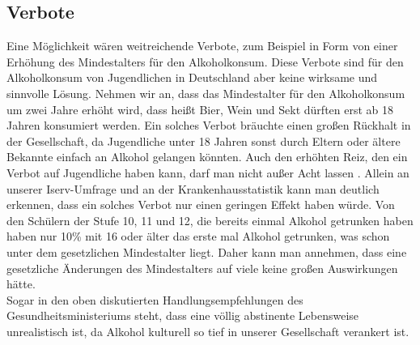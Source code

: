 \documentclass[12pt]{article}
\begin{document}
\subsection{Verbote}
Eine Möglichkeit wären weitreichende Verbote, zum Beispiel in Form von einer Erhöhung des Mindestalters für den Alkoholkonsum. Diese Verbote sind für den Alkoholkonsum von Jugendlichen in Deutschland aber keine wirksame und sinnvolle Lösung. Nehmen wir an, dass das Mindestalter für den Alkoholkonsum um zwei Jahre erhöht wird, dass heißt Bier, Wein und Sekt dürften erst ab 18 Jahren konsumiert werden. Ein solches Verbot bräuchte einen großen Rückhalt in der Gesellschaft, da Jugendliche unter 18 Jahren sonst durch Eltern oder ältere Bekannte einfach an Alkohol gelangen könnten. Auch den erhöhten Reiz, den ein Verbot auf Jugendliche haben kann, darf man nicht außer Acht lassen \autocite[169]{skala_jugend_2020}. 
Allein an unserer Iserv-Umfrage und an der Krankenhausstatistik kann man deutlich erkennen, dass ein solches Verbot nur einen geringen Effekt haben würde. Von den Schülern der Stufe 10, 11 und 12, die bereits einmal Alkohol getrunken haben haben nur 10\% mit 16 oder älter das erste mal Alkohol getrunken, was schon unter dem gesetzlichen Mindestalter liegt. Daher kann man annehmen, dass eine gesetzliche Änderungen des Mindestalters auf viele keine großen Auswirkungen hätte.\\
Sogar in den oben diskutierten Handlungsempfehlungen des Gesundheitsministeriums steht, dass eine völlig abstinente Lebensweise unrealistisch ist, da Alkohol kulturell so tief in unserer Gesellschaft verankert ist.\autocite[24]{kuhn_empfehlungen_nodate}
\end{document}
